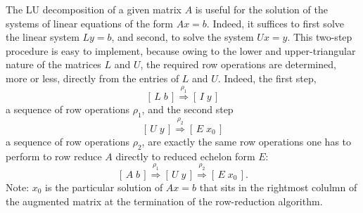 \documentclass[12pt]{article}
\begin{document}
The LU decomposition of a given matrix $A$ is useful for the solution
of the  systems of linear equations of the form $Ax = b$.  Indeed, it
suffices to first solve the linear system $Ly=b$, and second, to solve
the system $Ux=y$.  This two-step procedure is easy to implement,
because owing to the lower and upper-triangular nature of  the
matrices $L$ and $U$, the required row operations are determined, more
or less, directly from the entries of $L$ and $U$.  Indeed, the first
step, 
\[ [\, L\; b\, ] \stackrel{\rho_1}{\Longrightarrow}  [\, I \; y \,] \]
a sequence of row operations $\rho_1$, and the second step
\[ [\, U\; y\, ] \stackrel{\rho_2}{\Longrightarrow}  [\, E \; x_0 \,] \]
a sequence of row operations $\rho_2$, are exactly the same row operations 
one has to perform to row reduce $A$ directly to reduced echelon form $E$:
\[ 
[\, A\; b\, ] \stackrel{\rho_1}{\Longrightarrow} [\, U\; y \, ] 
\stackrel{\rho_2}{\Longrightarrow} [\, E\; x_0 \, ] .
\]
Note: $x_0$ is the particular solution of $Ax=b$  that sits in the
rightmost colulmn of the augmented matrix at the termination of the
row-reduction algorithm.
\end{document}
